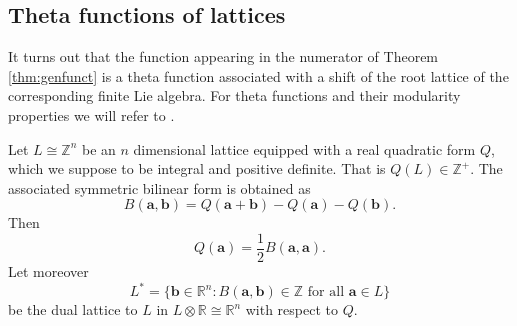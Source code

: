 \documentclass[11pt,a4paper]{amsart}
\theoremstyle{definition}
\newcommand{\SZ}{\mathbb{Z}}                    %
\newcommand{\SR}{\mathbb{R}}                    %
\begin{document}



\subsection{Theta functions of lattices}

It turns out that the function appearing in the numerator of Theorem \ref{thm:genfunct} is a theta function associated with a shift of the root lattice of the corresponding finite Lie algebra. For theta functions and their modularity properties we will refer to
\cite[Chapter 14]{cohen2017modular}. %

Let $L\cong \SZ^n$ be an $n$ dimensional lattice equipped with a real quadratic form $Q$, which we suppose to be integral and positive definite. That is $Q(L) \in \SZ^+$. %
The associated symmetric bilinear form is obtained as
\[ B(\mathbf{a},\mathbf{b})= Q(\mathbf{a}+\mathbf{b})-Q(\mathbf{a})-Q(\mathbf{b}). \]
Then
\[ Q(\mathbf{a})=\frac{1}{2}B(\mathbf{a},\mathbf{a}). \]
Let moreover 
\[ L^{\ast} = \{ \mathbf{b}\in \SR^n : B(\mathbf{a},\mathbf{b}) \in \SZ \textrm{ for all } \mathbf{a} \in L \}\] be the dual lattice to $L$ in $L\otimes \SR \cong \SR^n$ with respect to $Q$.
 
\end{document}
